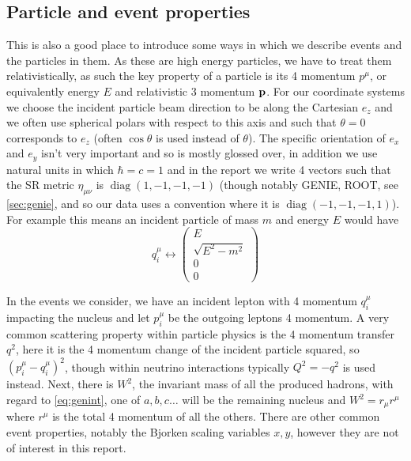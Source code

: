 \documentclass[a4paper,12pt]{article}
\DeclareMathOperator{\diag}{diag}
\begin{document}
\subsection{Particle and event properties}
This is also a good place to introduce some ways in which we describe events and the particles in them.
As these are high energy particles, we have to treat them relativistically, as such the key property of a particle is its 4 momentum $p^\mu$, or equivalently energy $E$ and relativistic 3 momentum $\vb{p}$.
For our coordinate systems we choose the incident particle beam direction to be along the Cartesian $e_z$ and we often use spherical polars with respect to this axis and such that $\theta = 0$ corresponds to $e_z$ (often $\cos{\theta}$ is used instead of $\theta$).
The specific orientation of $e_x$ and $e_y$ isn't very important and so is mostly glossed over, in addition we use natural units in which $\hbar = c = 1$ and in the report we write 4 vectors such that the SR metric $\eta_{\mu \nu}$ is $\diag(1, -1, -1, -1)$ (though notably GENIE, ROOT, see \cref{sec:genie}, and so our data uses a convention where it is $\diag(-1, -1, -1, 1)$).
For example this means an incident particle of mass $m$ and energy $E$ would have
\begin{equation}
    q_i^\mu \leftrightarrow \begin{pmatrix} E \\ \sqrt{E^2 - m^2} \\ 0 \\ 0 \end{pmatrix}
\end{equation}

In the events we consider, we have an incident lepton with 4 momentum $q_{i}^\mu$ impacting the nucleus and let $p_i^\mu$ be the outgoing leptons 4 momentum.
A very common scattering property within particle physics is the 4 momentum transfer $q^2$, here it is the 4 momentum change of the incident particle squared, so $(p_i^\mu - q_i^\mu)^2$, though within neutrino interactions typically $Q^2 = -q^2$ is used instead.
Next, there is $W^2$, the invariant mass of all the produced hadrons, with regard to \cref{eq:genint}, one of $a, b, c \ldots$ will be the remaining nucleus and $W^2 = r_\mu r^\mu$ where $r^\mu$ is the total 4 momentum of all the others.
There are other common event properties, notably the Bjorken scaling variables $x, y$, however they are not of interest in this report.
\end{document}

